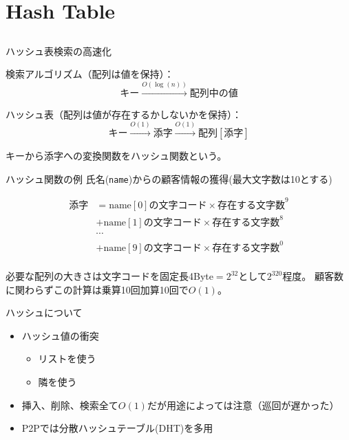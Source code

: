 \documentclass{beamer}
\subtitle{木、グラフ、アルゴリズム}
\begin{document}
\begin{frame}[fragile]{}
\titlepage
\end{frame}

\section{Hash Table}		%
\subsection{}

\begin{frame}[fragile]{ハッシュ表}{検索の高速化}

検索アルゴリズム（配列は値を保持）：
\[
キー \stackrel{O(\log(n))}{\longrightarrow} 配列中の値
\]

\vfill
ハッシュ表（配列は値が存在するかしないかを保持）：
\[
キー \stackrel{O(1)}{\longrightarrow} 添字 \stackrel{O(1)}{\longrightarrow} 配列[添字]
\]

\vfill
キーから添字への変換関数をハッシュ関数という。
\end{frame}

\begin{frame}[fragile]{ハッシュ関数の例}{}
氏名(\texttt{name})からの顧客情報の獲得(最大文字数は10とする)

\begin{align*}
添字
&= \text{name}[0]の文字コード\times \text{存在する文字数}^{9}\\
&+ \text{name}[1]の文字コード\times \text{存在する文字数}^{8}\\
& \cdots \\ 
&+ \text{name}[9]の文字コード\times \text{存在する文字数}^{0}\\
\end{align*}

必要な配列の大きさは文字コードを固定長4Byte$=2^{32}$として$2^{320}$程度。
顧客数に関わらずこの計算は乗算10回加算10回で$O(1)$。
\end{frame}

\begin{frame}[fragile]{ハッシュについて}{}
\begin{itemize}\itemsep8pt
\item ハッシュ値の衝突
\begin{itemize}\itemsep8pt
\item リストを使う
\item 隣を使う
\end{itemize}
\item 挿入、削除、検索全て$O(1)$だが用途によっては注意（巡回が遅かった）
\item P2Pでは分散ハッシュテーブル(DHT)を多用
\end{itemize}
\end{frame}
\end{document}
